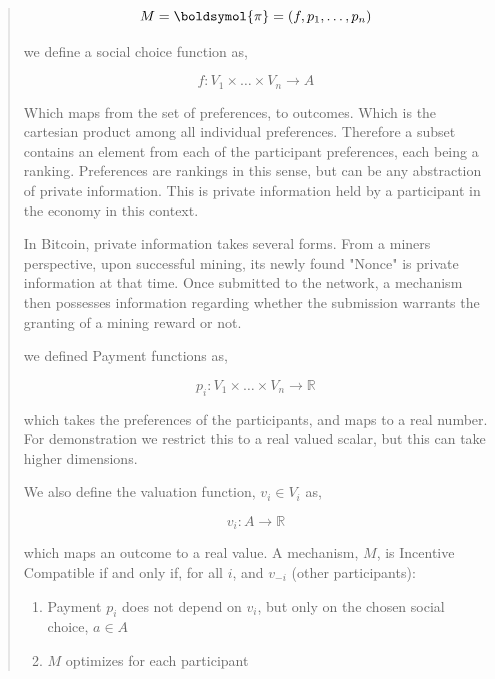 \documentclass[12pt, titlepage, twocolumn]{report}
\begin{document}
\begin{quotation}
\begin{equation}
M = \boldsymol{\pi} = (f, p_1, \ldots, p_n)
\end{equation}

we define a social choice function as,

\begin{equation}
f: V_1 \times \ldots \times V_n \rightarrow A
\end{equation}

Which maps from the set of preferences, to outcomes. Which is the cartesian product among all individual preferences. Therefore a subset contains an element from each of the participant preferences, each being a ranking.  Preferences are rankings in this sense, but can be any abstraction of private information. This is private information held by a participant in the economy in this context. 

In Bitcoin, private information takes several forms. From a miners perspective, upon successful mining, its newly found "Nonce" is private information at that time. Once submitted to the network, a mechanism then possesses information regarding whether the submission warrants the granting of a mining reward or not. 

we defined Payment functions as,

\begin{equation}
p_i : V_1 \times \ldots \times V_n \rightarrow \mathbb{R}
\end{equation}

which takes the preferences of the participants, and maps to a real number. For demonstration we restrict this to a real valued scalar, but this can take higher dimensions.

We also define the valuation function, \(v_i \in V_i \) as,

\begin{equation}
v_i : A \rightarrow \mathbb{R}
\end{equation}

which maps an outcome to a real value. A mechanism, \(M\), is Incentive Compatible if and only if, for all \(i\), and \(v_{-i}\) (other participants):

\begin{enumerate}
\item Payment \(p_i\) does not depend on \(v_i\), but only on the chosen social choice, \(a \in A\)
\item \(M\) optimizes for each participant
\end{enumerate}


\end{quotation}
\end{document}
